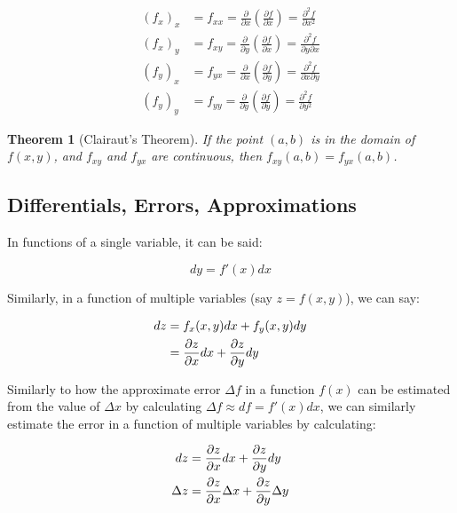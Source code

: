 \documentclass[12pt]{article}
\newtheorem{theorem}{Theorem}
\begin{document}
\begin{equation}
    \begin{split}
      (f_x)_x &= f_{xx} = \frac{\partial}{\partial x}(\frac{\partial f}{\partial x}) = \frac{\partial^2f}{\partial x^2}\\
      (f_x)_y &= f_{xy} = \frac{\partial}{\partial y}(\frac{\partial f}{\partial x}) = \frac{\partial^2f}{\partial y \partial x}\\
    (f_y)_x &= f_{yx} = \frac{\partial}{\partial x}(\frac{\partial f}{\partial y}) = \frac{\partial^2f}{\partial x \partial y}\\
    (f_y)_y &= f_{yy} = \frac{\partial}{\partial y}(\frac{\partial f}{\partial y}) = \frac{\partial^2f}{\partial y^2}
    \end{split}
\end{equation}


\begin{theorem}[Clairaut's Theorem]
    If the point $(a,b)$ is in the domain of $f(x,y)$, and $f_{xy}$ and $f_{yx}$ are continuous, then $f_{xy}(a,b)=f_{yx}(a,b)$.
\end{theorem}

\subsection{Differentials, Errors, Approximations}

In functions of a single variable, it can be said:

\[
    dy = f'(x) dx    
\]

Similarly, in a function of multiple variables (say $z = f(x,y)$), we can say:

\begin{equation}
    \begin{split}
    dz &= f_x(x,y) dx + f_y(x,y) dy\\
    &= \frac{\partial z}{\partial x} dx + \frac{\partial z}{\partial y} dy
    \end{split}
\end{equation}

Similarly to how the approximate error $\Delta f$ in a function $f(x)$ can be estimated from the value of $\Delta x$ by calculating $\Delta f \approx df =  f'(x) dx$, we can similarly estimate the error in a function of multiple variables by calculating:

\begin{equation}
    \begin{split}
     dz &= \frac{\partial z}{\partial x} dx + \frac{\partial z}{\partial y} dy\\
    \Delta z &= \frac{\partial z}{\partial x} \Delta x + \frac{\partial z}{\partial y} \Delta y   
    \end{split}
\end{equation}
\end{document}
